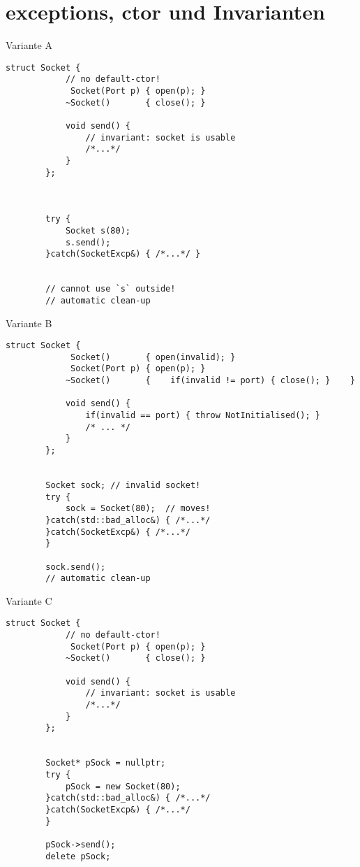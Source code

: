 \section{exceptions, ctor und Invarianten}

\begin{frame}[t, fragile]{ Variante A }
	\begin{lstlisting}[basicstyle=\scriptsize]
		struct Socket {
			// no default-ctor!
			 Socket(Port p) { open(p); }
			~Socket()       { close(); }
			
			void send() {
				// invariant: socket is usable
				/*...*/
			}
		};
		
		
		
		try {
			Socket s(80);
			s.send();
		}catch(SocketExcp&) { /*...*/ }
		
		
		// cannot use `s` outside!
		// automatic clean-up
	\end{lstlisting}
\end{frame}

\begin{frame}[t, fragile]{ Variante B }
	\begin{lstlisting}[basicstyle=\scriptsize]
		struct Socket {
			 Socket()       { open(invalid); }
			 Socket(Port p) { open(p); }
			~Socket()       {    if(invalid != port) { close(); }    }
			
			void send() {
				if(invalid == port) { throw NotInitialised(); }
				/* ... */
			}
		};
		
		
		Socket sock; // invalid socket!
		try {
			sock = Socket(80);	// moves!
		}catch(std::bad_alloc&) { /*...*/
		}catch(SocketExcp&) { /*...*/
		}
		
		sock.send();
		// automatic clean-up
	\end{lstlisting}
\end{frame}

\begin{frame}[t, fragile]{ Variante C }
	\begin{lstlisting}[basicstyle=\scriptsize]
		struct Socket {
			// no default-ctor!
			 Socket(Port p) { open(p); }
			~Socket()       { close(); }
			
			void send() {
				// invariant: socket is usable
				/*...*/
			}
		};
		
		
		Socket* pSock = nullptr;
		try {
			pSock = new Socket(80);
		}catch(std::bad_alloc&) { /*...*/
		}catch(SocketExcp&) { /*...*/
		}
		
		pSock->send();
		delete pSock;
	\end{lstlisting}
\end{frame}

